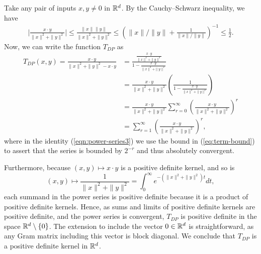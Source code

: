 Take any pair of inputs $x,y\neq 0$ in $\mathbb{R}^d$. By the Cauchy--Schwarz inequality, we have
\begin{align}
     \label{eq:term-bound}
\Bigg| \frac{x\cdot y}{\|x\|^2 + \|y\|^2} \Bigg|\leq \frac{\|x\|\|y\|}{\|x\|^2 + \|y\|^2} \leq \left(\|x\|/\|y\| + \frac{1}{\|x\|/\|y\|} \right)^{-1} \leq \frac{1}{2}.
\end{align}
Now, we can write the function $T_{DP}$ as
\begin{align}
    T_{DP}(x,y) = \frac{x\cdot y}{\|x\|^2 + \|y\|^2 - x\cdot y} &= \frac{\frac{x\cdot y}{\|x\|^2 + \|y\|^2}}{1 - \frac{x\cdot y}{\|x\|^2 + \|y\|^2}} \label{eqn:power-series1} \\
    &= \frac{x\cdot y}{\|x\|^2 + \|y\|^2}\left(\frac{1}{1 - \frac{x\cdot y}{\|x\|^2 + \|y\|^2}}\right) \label{eqn:power-series2} \\
    &= \frac{x\cdot y}{\|x\|^2 + \|y\|^2} \sum_{r=0}^\infty \left(\frac{x\cdot y}{\|x\|^2 + \|y\|^2}\right)^r \label{eqn:power-series3} \\
    &= \sum_{r=1}^\infty \left(\frac{x\cdot y}{\|x\|^2 + \|y\|^2}\right)^r \label{eqn:power-series},
\end{align}
where in the identity (\ref{eqn:power-series3}) we use the bound in (\ref{eq:term-bound}) to assert that the series is bounded by $2^{-r}$ and thus absolutely convergent.

Furthermore, because $(x,y)\mapsto x\cdot y$ is a positive definite kernel, and so is
$$(x,y)\mapsto \frac{1}{\|x\|^2+\|y\|^2 } = \int_{0}^\infty  e^{-(\|x\|^2+\|y\|^2)t}  dt,$$
each summand in the power series is positive definite because it is a product of positive definite kernels.
Hence, as sums and limits of positive definite kernels are positive definite, and the power series is convergent, $T_{DP}$ is positive definite in the space $\mathbb{R}^d\setminus \{0\}$. The extension to include the vector $0\in\mathbb{R}^d$ is straightforward, as any Gram matrix including this vector is block diagonal. We conclude that $T_{DP}$ is a positive definite kernel in $\mathbb{R}^d$. 

